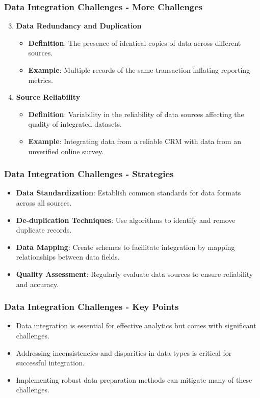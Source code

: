 \documentclass{beamer}
\begin{document}
\begin{frame}[fragile]
    \frametitle{Data Integration Challenges - More Challenges}
    \begin{enumerate}
        \setcounter{enumi}{2}
        \item \textbf{Data Redundancy and Duplication}
            \begin{itemize}
                \item \textbf{Definition}: The presence of identical copies of data across different sources.
                \item \textbf{Example}: Multiple records of the same transaction inflating reporting metrics.
            \end{itemize}
        \item \textbf{Source Reliability}
            \begin{itemize}
                \item \textbf{Definition}: Variability in the reliability of data sources affecting the quality of integrated datasets.
                \item \textbf{Example}: Integrating data from a reliable CRM with data from an unverified online survey.
            \end{itemize}
    \end{enumerate}
\end{frame}

\begin{frame}[fragile]
    \frametitle{Data Integration Challenges - Strategies}
    \begin{itemize}
        \item \textbf{Data Standardization}: Establish common standards for data formats across all sources.
        \item \textbf{De-duplication Techniques}: Use algorithms to identify and remove duplicate records.
        \item \textbf{Data Mapping}: Create schemas to facilitate integration by mapping relationships between data fields.
        \item \textbf{Quality Assessment}: Regularly evaluate data sources to ensure reliability and accuracy.
    \end{itemize}
\end{frame}

\begin{frame}[fragile]
    \frametitle{Data Integration Challenges - Key Points}
    \begin{itemize}
        \item Data integration is essential for effective analytics but comes with significant challenges.
        \item Addressing inconsistencies and disparities in data types is critical for successful integration.
        \item Implementing robust data preparation methods can mitigate many of these challenges.
    \end{itemize}
\end{frame}
\end{document}
